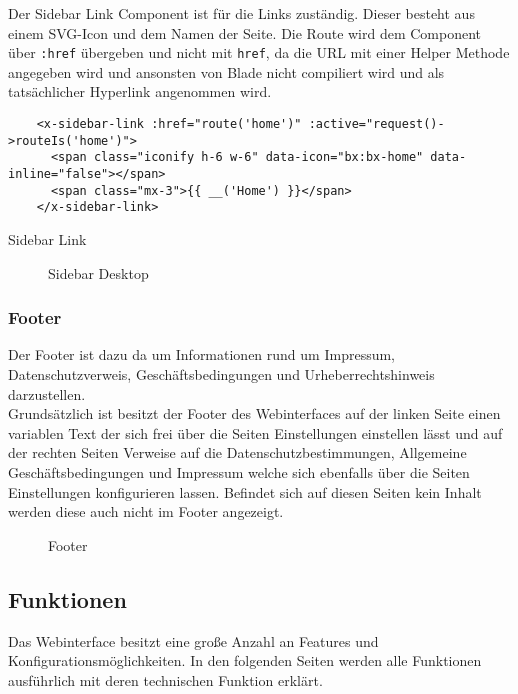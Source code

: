 Der Sidebar Link Component ist für die Links zuständig. Dieser besteht aus einem
\acs*{SVG}-Icon und dem Namen der Seite. Die Route wird dem Component über
\verb|:href| übergeben und nicht mit \verb|href|, da die URL mit einer Helper Methode
angegeben wird und ansonsten von Blade nicht compiliert wird und als
tatsächlicher Hyperlink angenommen wird.

\begin{listing}[H]
  \begin{verbatim}
    <x-sidebar-link :href="route('home')" :active="request()->routeIs('home')">
      <span class="iconify h-6 w-6" data-icon="bx:bx-home" data-inline="false"></span>
      <span class="mx-3">{{ __('Home') }}</span>
    </x-sidebar-link>
  \end{verbatim}
  \caption{Sidebar Link}
\end{listing}
\begin{figure}[H]
  \centering
  \caption{Sidebar Desktop}
\end{figure}

\subsubsection{Footer}
Der Footer ist dazu da um Informationen rund um Impressum, Datenschutzverweis,
Geschäftsbedingungen und Urheberrechtshinweis darzustellen.\\

Grundsätzlich ist besitzt der Footer des Webinterfaces auf der linken Seite
einen variablen Text der sich frei über die Seiten Einstellungen einstellen
lässt und auf der rechten Seiten Verweise auf die Datenschutzbestimmungen,
Allgemeine Geschäftsbedingungen und Impressum welche sich ebenfalls über die
Seiten Einstellungen konfigurieren lassen. Befindet sich auf diesen Seiten kein
Inhalt werden diese auch nicht im Footer angezeigt.

\begin{figure}[H]
  \centering
  \caption{Footer}
\end{figure}

\subsection{Funktionen}
Das Webinterface besitzt eine große Anzahl an Features und
Konfigurationsmöglichkeiten. In den folgenden Seiten werden alle Funktionen
ausführlich mit deren technischen Funktion erklärt.

